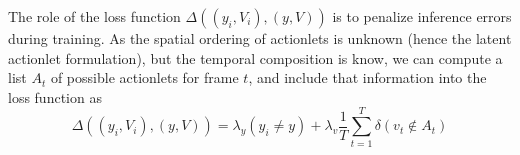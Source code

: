 The role of the loss function $\Delta((y_i,V_i),(y,V))$ is to penalize inference errors during 
training. As the spatial ordering of actionlets is unknown (hence the latent 
actionlet formulation), but the temporal composition is know, we can compute a 
list $A_t$ of possible actionlets for frame $t$, and include  that information 
into the loss function as
{\small \begin{equation}
\Delta((y_i,V_i),(y,V)) = \lambda_y(y_i \ne y) + \lambda_v\frac{1}{T}\sum_{t=1}^T 
\delta(v_t \notin A_t)
\end{equation}}

